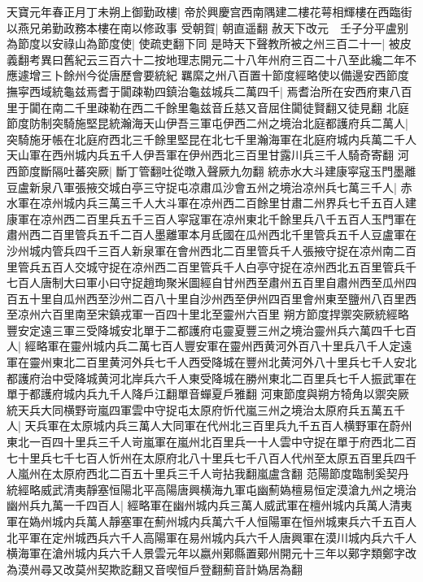 天寶元年春正月丁未朔上御勤政樓|{
	帝於興慶宫西南隅建二樓花萼相輝樓在西臨街以燕兄弟勤政務本樓在南以修政事}
受朝賀|{
	朝直遥翻}
赦天下改元　壬子分平盧别為節度以安祿山為節度使|{
	使疏吏翻下同}
是時天下聲教所被之州三百二十一|{
	被皮義翻考異曰舊紀云三百六十二按地理志開元二十八年州府三百二十八至此纔二年不應遽增三卜餘州今從唐歷會要統紀}
羈縻之州八百置十節度經略使以備邊安西節度撫寜西域統龜兹焉耆于闐疎勒四鎮治龜兹城兵二萬四千|{
	焉耆治所在安西府東八百里于闐在南二千里疎勒在西二千餘里龜兹音丘慈又音屈住闐徒賢翻又徒見翻}
北庭節度防制突騎施堅昆統瀚海天山伊吾三軍屯伊西二州之境治北庭都護府兵二萬人|{
	突騎施牙帳在北庭府西北三千餘里堅昆在北七千里瀚海軍在北庭府城内兵萬二千人天山軍在西州城内兵五千人伊吾軍在伊州西北三百里甘露川兵三千人騎奇寄翻}
河西節度斷隔吐蕃突厥|{
	斷丁管翻吐從暾入聲厥九勿翻}
統赤水大斗建康寜寇玉門墨離豆盧新泉八軍張掖交城白亭三守捉屯凉肅瓜沙會五州之境治凉州兵七萬三千人|{
	赤水軍在凉州城内兵三萬三千人大斗軍在凉州西二百餘里甘肅二州界兵七千五百人建康軍在凉州西二百里兵五千三百人寜寇軍在凉州東北千餘里兵八千五百人玉門軍在肅州西二百里管兵五千二百人墨離軍本月氐國在瓜州西北千里管兵五千人豆盧軍在沙州城内管兵四千三百人新泉軍在會州西北二百里管兵千人張掖守捉在凉州南二百里管兵五百人交城守捉在凉州西二百里管兵千人白亭守捉在凉州西北五百里管兵千七百人唐制大曰軍小曰守捉趙珣聚米圖經自甘州西至肅州五百里自肅州西至瓜州四百五十里自瓜州西至沙州二百八十里自沙州西至伊州四百里會州東至鹽州八百里西至凉州六百里南至宋鎮戎軍一百四十里北至靈州六百里}
朔方節度捍禦突厥統經略豐安定遠三軍三受降城安北單于二都護府屯靈夏豐三州之境治靈州兵六萬四千七百人|{
	經略軍在靈州城内兵二萬七百人豐安軍在靈州西黄河外百八十里兵八千人定遠軍在靈州東北二百里黄河外兵七千人西受降城在豐州北黄河外八十里兵七千人安北都護府治中受降城黄河北岸兵六千人東受降城在勝州東北二百里兵七千人振武軍在單于都護府城内兵九千人降戶江翻單音蟬夏戶雅翻}
河東節度與朔方犄角以禦突厥統天兵大同横野岢嵐四軍雲中守捉屯太原府忻代嵐三州之境治太原府兵五萬五千人|{
	天兵軍在太原城内兵三萬人大同軍在代州北三百里兵九千五百人横野軍在蔚州東北一百四十里兵三千人岢嵐軍在嵐州北百里兵一十人雲中守捉在單于府西北二百七十里兵七千七百人忻州在太原府北八十里兵七千八百人代州至太原五百里兵四千人嵐州在太原府西北二百五十里兵三千人岢拈我翻嵐盧含翻}
范陽節度臨制奚契丹統經略威武清夷靜塞恒陽北平高陽唐興横海九軍屯幽薊媯檀易恒定漠滄九州之境治幽州兵九萬一千四百人|{
	經略軍在幽州城内兵三萬人威武軍在檀州城内兵萬人清夷軍在媯州城内兵萬人靜塞軍在薊州城内兵萬六千人恒陽軍在恒州城東兵六千五百人北平軍在定州城西兵六千人高陽軍在易州城内兵六千人唐興軍在漠川城内兵六千人横海軍在滄州城内兵六千人景雲元年以嬴州鄚縣置鄚州開元十三年以鄚字類鄭字改為漠州尋又改莫州契欺訖翻又音喫恒戶登翻薊音計媯居為翻}

